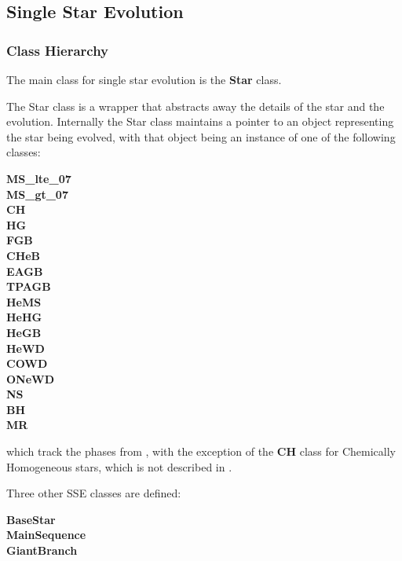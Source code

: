 \subsection{Single Star Evolution}\label{sec:SingleStarEvolution}

\subsubsection{Class Hierarchy}\label{sec:SSEClassHierarchy}

The main class for single star evolution is the \textbf{Star} class.  

The Star class is a wrapper that abstracts away the details of the star and the evolution.  Internally the Star class maintains a pointer to an object representing the star being evolved, with that object being an instance of one of the following classes:

\bigskip
\hfill
\begin{minipage}{\dimexpr\textwidth-2em}
    \textbf{MS\_lte\_07} \\
    \textbf{MS\_gt\_07} \\
    \textbf{CH} \\
    \textbf{HG} \\
    \textbf{FGB} \\
    \textbf{CHeB} \\
    \textbf{EAGB} \\
    \textbf{TPAGB} \\
    \textbf{HeMS} \\
    \textbf{HeHG} \\
    \textbf{HeGB \\}
    \textbf{HeWD} \\
    \textbf{COWD} \\
    \textbf{ONeWD} \\
    \textbf{NS} \\
    \textbf{BH} \\
    \textbf{MR} \\
\end{minipage}

which track the phases from \citet{Hurley_2000}, with the exception of the \textbf{CH} class for Chemically Homogeneous stars, which is not described in \citet{Hurley_2000}.

Three other SSE classes are defined:

\bigskip
\hfill
\begin{minipage}{\dimexpr\textwidth-2em}
    \textbf{BaseStar} \\
    \textbf{MainSequence} \\
    \textbf{GiantBranch} \\
\end{minipage}
 

